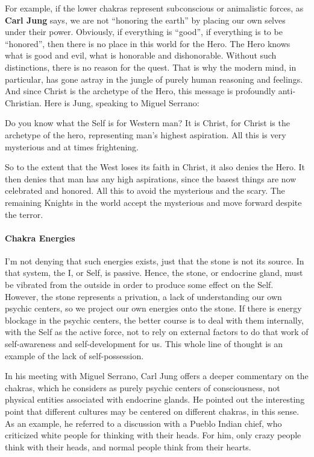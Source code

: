 For example, if the lower chakras represent subconscious or animalistic forces, as \textbf{Carl Jung} says, we are not “honoring the earth” by placing our own selves under their power. Obviously, if everything is “good”, if everything is to be “honored”, then there is no place in this world for the Hero. The Hero knows what is good and evil, what is honorable and dishonorable. Without such distinctions, there is no reason for the quest. That is why the modern mind, in particular, has gone astray in the jungle of purely human reasoning and feelings. And since Christ is the archetype of the Hero, this message is profoundly anti-Christian. Here is Jung, speaking to Miguel Serrano:

\begin{quotex}
Do you know what the Self is for Western man? It is Christ, for Christ is the archetype of the hero, representing man's highest aspiration. All this is very mysterious and at times frightening. 

\end{quotex}
So to the extent that the West loses its faith in Christ, it also denies the Hero. It then denies that man has any high aspirations, since the basest things are now celebrated and honored. All this to avoid the mysterious and the scary. The remaining Knights in the world accept the mysterious and move forward despite the terror.

\paragraph{Chakra Energies}
I'm not denying that such energies exists, just that the stone is not its source. In that system, the I, or Self, is passive. Hence, the stone, or endocrine gland, must be vibrated from the outside in order to produce some effect on the Self. However, the stone represents a privation, a lack of understanding our own psychic centers, so we project our own energies onto the stone. If there is energy blockage in the psychic centers, the better course is to deal with them internally, with the Self as the active force, not to rely on external factors to do that work of self-awareness and self-development for us. This whole line of thought is an example of the lack of self-possession.

In his meeting with Miguel Serrano, Carl Jung offers a deeper commentary on the chakras, which he considers as purely psychic centers of consciousness, not physical entities associated with endocrine glands. He pointed out the interesting point that different cultures may be centered on different chakras, in this sense. As an example, he referred to a discussion with a Pueblo Indian chief, who criticized white people for thinking with their heads. For him, only crazy people think with their heads, and normal people think from their hearts.

